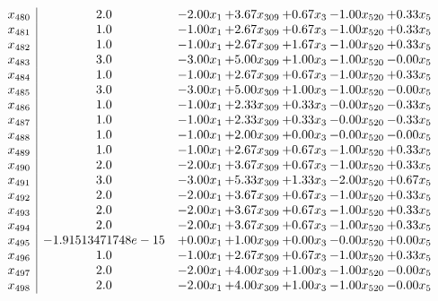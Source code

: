 \documentclass[8pt]{article}
\begin{document}
\[\begin{array}{c| c c@{\hskip 2pt} c@{\hskip 2pt} c@{\hskip 2pt} c@{\hskip 2pt} c@{\hskip 2pt} }
 x_{480}   &  2.0 & -2.00 x_{1} & +  3.67 x_{309} & +  0.67 x_{3} & -1.00 x_{520} & +  0.33 x_{5}\\
 x_{481}   &  1.0 & -1.00 x_{1} & +  2.67 x_{309} & +  0.67 x_{3} & -1.00 x_{520} & +  0.33 x_{5}\\
 x_{482}   &  1.0 & -1.00 x_{1} & +  2.67 x_{309} & +  1.67 x_{3} & -1.00 x_{520} & +  0.33 x_{5}\\
 x_{483}   &  3.0 & -3.00 x_{1} & +  5.00 x_{309} & +  1.00 x_{3} & -1.00 x_{520} & -0.00 x_{5}\\
 x_{484}   &  1.0 & -1.00 x_{1} & +  2.67 x_{309} & +  0.67 x_{3} & -1.00 x_{520} & +  0.33 x_{5}\\
 x_{485}   &  3.0 & -3.00 x_{1} & +  5.00 x_{309} & +  1.00 x_{3} & -1.00 x_{520} & -0.00 x_{5}\\
 x_{486}   &  1.0 & -1.00 x_{1} & +  2.33 x_{309} & +  0.33 x_{3} & -0.00 x_{520} & -0.33 x_{5}\\
 x_{487}   &  1.0 & -1.00 x_{1} & +  2.33 x_{309} & +  0.33 x_{3} & -0.00 x_{520} & -0.33 x_{5}\\
 x_{488}   &  1.0 & -1.00 x_{1} & +  2.00 x_{309} & +  0.00 x_{3} & -0.00 x_{520} & -0.00 x_{5}\\
 x_{489}   &  1.0 & -1.00 x_{1} & +  2.67 x_{309} & +  0.67 x_{3} & -1.00 x_{520} & +  0.33 x_{5}\\
 x_{490}   &  2.0 & -2.00 x_{1} & +  3.67 x_{309} & +  0.67 x_{3} & -1.00 x_{520} & +  0.33 x_{5}\\
 x_{491}   &  3.0 & -3.00 x_{1} & +  5.33 x_{309} & +  1.33 x_{3} & -2.00 x_{520} & +  0.67 x_{5}\\
 x_{492}   &  2.0 & -2.00 x_{1} & +  3.67 x_{309} & +  0.67 x_{3} & -1.00 x_{520} & +  0.33 x_{5}\\
 x_{493}   &  2.0 & -2.00 x_{1} & +  3.67 x_{309} & +  0.67 x_{3} & -1.00 x_{520} & +  0.33 x_{5}\\
 x_{494}   &  2.0 & -2.00 x_{1} & +  3.67 x_{309} & +  0.67 x_{3} & -1.00 x_{520} & +  0.33 x_{5}\\
 x_{495}   &  -1.91513471748e-15 & +  0.00 x_{1} & +  1.00 x_{309} & +  0.00 x_{3} & -0.00 x_{520} & +  0.00 x_{5}\\
 x_{496}   &  1.0 & -1.00 x_{1} & +  2.67 x_{309} & +  0.67 x_{3} & -1.00 x_{520} & +  0.33 x_{5}\\
 x_{497}   &  2.0 & -2.00 x_{1} & +  4.00 x_{309} & +  1.00 x_{3} & -1.00 x_{520} & -0.00 x_{5}\\
 x_{498}   &  2.0 & -2.00 x_{1} & +  4.00 x_{309} & +  1.00 x_{3} & -1.00 x_{520} & -0.00 x_{5}\\

\end{array}\]
\end{document}
